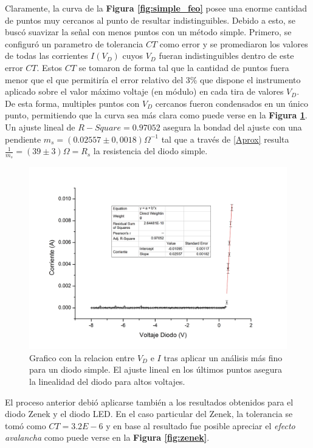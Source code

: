 \documentclass[11pt,a4paper]{article}
\begin{document}
Claramente, la curva de la \textbf{Figura \ref{fig:simple_feo}} posee una enorme cantidad de puntos muy cercanos al punto de resultar indistinguibles. Debido a esto, se buscó suavizar la señal con menos puntos con un método simple. Primero, se configuró un parametro de tolerancia $CT$ como error y se promediaron los valores de todas las corrientes $I(V_D)$ cuyos $V_D$ fueran indistinguibles dentro de este error $CT$. Estos $CT$ se tomaron de forma tal que la cantidad de puntos fuera menor que el que permitiría el error relativo del 3\% que dispone el instrumento aplicado sobre el valor máximo voltaje (en módulo) en cada tira de valores $V_D$. De esta forma, multiples puntos con $V_D$ cercanos fueron condensados en un único punto, permitiendo que la curva sea más clara como puede verse en la \textbf{Figura \ref{fig:simple_mejor}}. Un ajuste lineal de $R-Square = 0.97052$ asegura la bondad del ajuste con una pendiente $m_s = (0.02557 \pm 0,0018)\Omega^{-1}$ tal que a través de \eqref{Aprox} resulta $\frac{1}{m_s} = (39 \pm 3)\Omega= R_s$ la resistencia del diodo simple.

\begin{figure}[H]
\centering
\includegraphics[scale=0.36]{simple_mejor}
   \caption{Grafico con la relacion entre $V_D$ e $I$ tras aplicar un análisis más fino para un diodo simple. El ajuste lineal en los últimos puntos asegura la linealidad del diodo para altos voltajes.}
   \label{fig:simple_mejor}
\end{figure}

El proceso anterior debió aplicarse también a los resultados obtenidos para el diodo Zenek y el diodo LED. En el caso particular del Zenek, la tolerancia se tomó como $CT = 3.2E-6$ y en base al resultado fue posible apreciar el \textit{efecto avalancha} como puede verse en la \textbf{Figura \ref{fig:zenek}}. 
\end{document}
